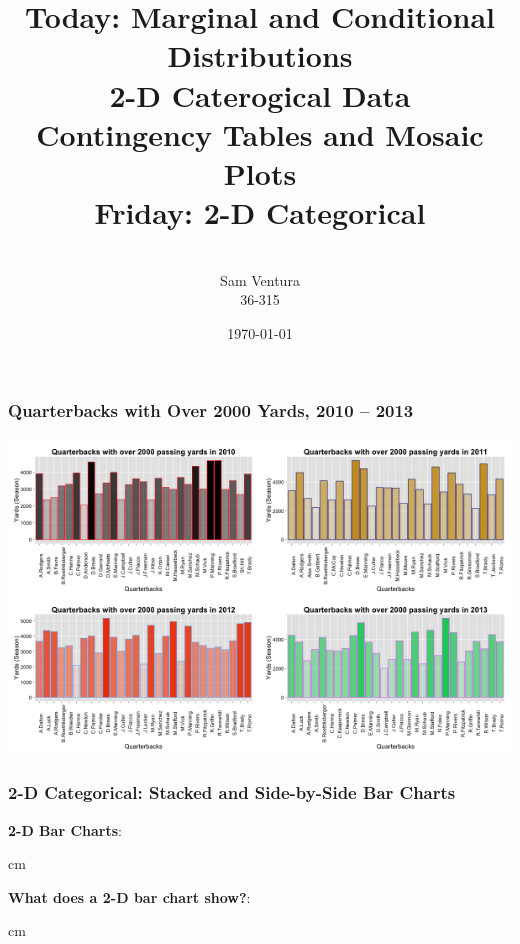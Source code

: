 \documentclass{beamer} %
\begin{document}
\title[dedup]{Today:  Marginal and Conditional Distributions \\ 2-D Caterogical Data \\ Contingency Tables and Mosaic Plots \\ Friday:  2-D Categorical}


\author[Samuel L. Ventura]{\\
  \large{Sam Ventura\\36-315}}
\date{\today}


\begin{frame}
	\maketitle
	
\end{frame}




\begin{frame}\frametitle{Quarterbacks with Over 2000 Yards, 2010 -- 2013}
	\includegraphics[width=\linewidth]{qbs.png}
\end{frame}




\begin{frame}\frametitle{2-D Categorical: Stacked and Side-by-Side Bar Charts}
	\small
	
	\textbf{2-D Bar Charts}:  %
	
	 cm
	
	\textbf{What does a 2-D bar chart show?}:  %
	
	
	
	 cm
	
\end{frame}
\end{document}
